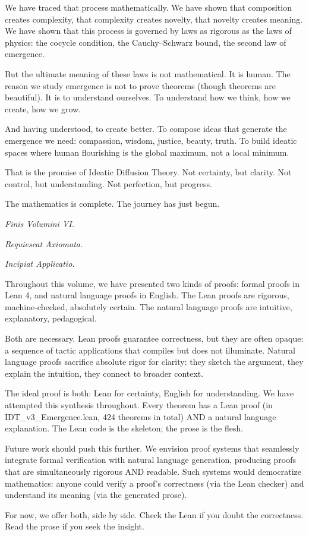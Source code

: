 We have traced that process mathematically. We have shown that composition
creates complexity, that complexity creates novelty, that novelty creates meaning.
We have shown that this process is governed by laws as rigorous as the laws of
physics: the cocycle condition, the Cauchy--Schwarz bound, the second law of
emergence.

But the ultimate meaning of these laws is not mathematical. It is human. The
reason we study emergence is not to prove theorems (though theorems are beautiful).
It is to understand ourselves. To understand how we think, how we create, how
we grow.

And having understood, to create better. To compose ideas that generate the
emergence we need: compassion, wisdom, justice, beauty, truth. To build ideatic
spaces where human flourishing is the global maximum, not a local minimum.

That is the promise of Ideatic Diffusion Theory. Not certainty, but clarity.
Not control, but understanding. Not perfection, but progress.

The mathematics is complete. The journey has just begun.

\vspace{1cm}

\noindent\textit{Finis Volumini VI.}

\noindent\textit{Requiescat Axiomata.}

\noindent\textit{Incipiat Applicatio.}

\vspace{1cm}

\begin{remark}
Throughout this volume, we have presented two kinds of proofs: formal proofs in
Lean 4, and natural language proofs in English. The Lean proofs are rigorous,
machine-checked, absolutely certain. The natural language proofs are intuitive,
explanatory, pedagogical.

Both are necessary. Lean proofs guarantee correctness, but they are often opaque:
a sequence of tactic applications that compiles but does not illuminate. Natural
language proofs sacrifice absolute rigor for clarity: they sketch the argument,
they explain the intuition, they connect to broader context.

The ideal proof is both: Lean for certainty, English for understanding. We have
attempted this synthesis throughout. Every theorem has a Lean proof (in
IDT\_v3\_Emergence.lean, 424 theorems in total) AND a natural language explanation.
The Lean code is the skeleton; the prose is the flesh.

Future work should push this further. We envision proof systems that seamlessly
integrate formal verification with natural language generation, producing proofs
that are simultaneously rigorous AND readable. Such systems would democratize
mathematics: anyone could verify a proof's correctness (via the Lean checker)
and understand its meaning (via the generated prose).

For now, we offer both, side by side. Check the Lean if you doubt the correctness.
Read the prose if you seek the insight.
\end{remark}

